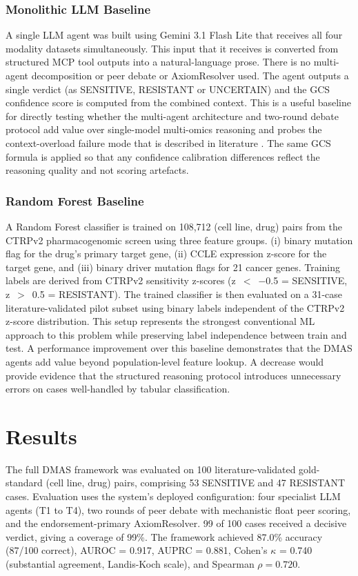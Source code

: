 \documentclass{article}
\begin{document}
\subsubsection{Monolithic LLM Baseline}
A single LLM agent was built using Gemini 3.1 Flash Lite that receives all four modality datasets simultaneously. This input that it receives is converted from structured MCP tool outputs into a natural-language prose. There is no multi-agent decomposition or peer debate or AxiomResolver used. The agent outputs a single verdict (as SENSITIVE, RESISTANT or UNCERTAIN) and the GCS confidence score is computed from the combined context. This is a useful baseline for directly testing whether the multi-agent architecture and two-round debate protocol add value over single-model multi-omics reasoning and probes the context-overload failure mode that is described in literature \cite{liu2026evomdt}. The same GCS formula is applied so that any confidence calibration differences reflect the reasoning quality and not scoring artefacts. 

\subsubsection{Random Forest Baseline}
A Random Forest classifier is trained on 108{,}712 (cell line, drug) pairs from the CTRPv2 pharmacogenomic screen using three feature groups. (i) binary mutation flag for the drug's primary target gene, (ii) CCLE expression z-score for the target gene, and (iii) binary driver mutation flags for 21 cancer genes. Training labels are derived from
CTRPv2 sensitivity z-scores (z~$<$~$-$0.5 = SENSITIVE, z~$>$~0.5 = RESISTANT). The trained classifier is then evaluated on a 31-case literature-validated pilot subset using binary labels independent of the CTRPv2 z-score distribution. This setup represents the strongest conventional ML approach to this problem while preserving label independence between train and test. A performance improvement over this baseline demonstrates that the DMAS agents add value beyond population-level feature lookup. A decrease would provide evidence that the structured reasoning protocol introduces unnecessary errors on cases well-handled by tabular classification.

\section{Results}
The full DMAS framework was evaluated on 100 literature-validated gold-standard (cell line, drug) pairs, comprising 53 SENSITIVE and 47 RESISTANT cases. Evaluation uses the system's deployed configuration: four specialist LLM agents (T1 to T4), two rounds of peer debate with mechanistic float peer scoring, and the endorsement-primary AxiomResolver. 99 of 100 cases received a decisive verdict, giving a coverage of 99\%. The framework achieved 87.0\% accuracy (87/100 correct), AUROC = 0.917, AUPRC = 0.881, Cohen's $\kappa$ = 0.740 (substantial agreement, Landis-Koch scale), and Spearman $\rho = 0.720$.
\end{document}

